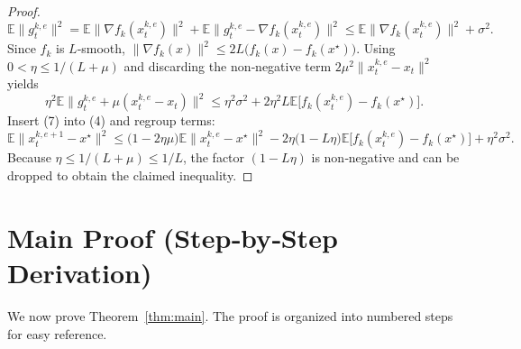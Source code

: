 \documentclass{article}
\newcommand{\E}{\mathbb{E}}
\begin{document}
\begin{proof}
\[
\E\!\|g_{t}^{k,e}\|^{2}
=\E\!\bigl\|\nabla f_k(x_{t}^{k,e})\bigr\|^{2}
+\E\!\bigl\|g_{t}^{k,e}-\nabla f_k(x_{t}^{k,e})\bigr\|^{2}
\le \E\!\bigl\|\nabla f_k(x_{t}^{k,e})\bigr\|^{2}+\sigma^{2}. \tag{6}
\]
Since $f_k$ is $L$‑smooth, $\|\nabla f_k(x)\|^{2}\le2L\bigl(f_k(x)-f_k(x^{\star})\bigr)$.
Using $0<\eta\le1/(L+\mu)$ and discarding the non‑negative term
$2\mu^{2}\|x_{t}^{k,e}-x_t\|^{2}$ yields
\[
\eta^{2}\E\!\|g_{t}^{k,e}+\mu(x_{t}^{k,e}-x_t)\|^{2}
\le\eta^{2}\sigma^{2}+2\eta^{2}L\E\!\bigl[f_k(x_{t}^{k,e})-f_k(x^{\star})\bigr]. \tag{7}
\]
Insert (7) into (4) and regroup terms:
\[
\E\!\|x_{t}^{k,e+1}-x^{\star}\|^{2}
\le\bigl(1-2\eta\mu\bigr)\E\!\|x_{t}^{k,e}-x^{\star}\|^{2}
-2\eta\bigl(1-L\eta\bigr)\E\!\bigl[f_k(x_{t}^{k,e})-f_k(x^{\star})\bigr]
+\eta^{2}\sigma^{2}. \tag{8}
\]
Because $\eta\le1/(L+\mu)\le1/L$, the factor $(1-L\eta)$ is non‑negative and can be dropped to obtain the claimed inequality. \hfill\qedsymbol
\end{proof}

\section*{Main Proof (Step‑by‑Step Derivation)}
We now prove Theorem~\ref{thm:main}.  The proof is organized into numbered
steps for easy reference.
\end{document}
